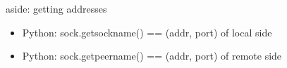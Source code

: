 \begin{frame}{aside: getting addresses}
\begin{itemize}
\item Python: sock.getsockname() == (addr, port) of local side
\item Python: sock.getpeername() == (addr, port) of remote side
\end{itemize}
\end{frame}

